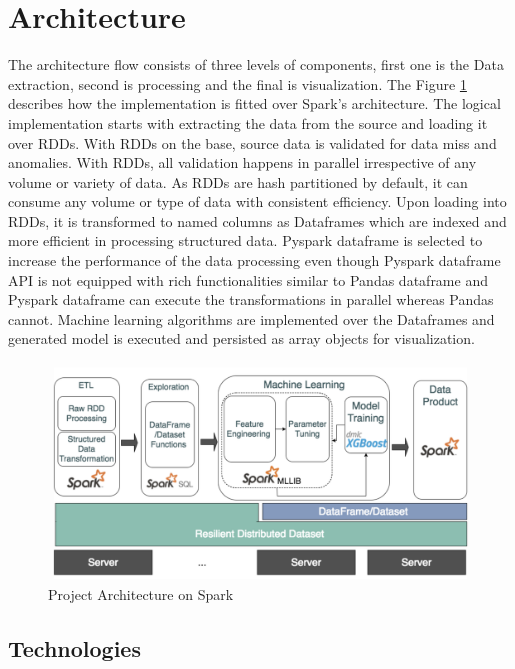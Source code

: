 \documentclass[sigconf]{acmart}
\begin{document}
\section{Architecture}
The architecture flow consists of three levels of components, first one is the Data extraction, second is processing and the final is visualization. The Figure \ref{Architecture:project} describes how the implementation is fitted over Spark's architecture.
The logical implementation starts with extracting the data from the source and loading it over RDDs. With RDDs on the base, source data is validated for data miss and anomalies. With RDDs, all validation happens in parallel irrespective of any volume or variety of data. As RDDs are hash partitioned by default, it can consume any volume or type of data with consistent efficiency. Upon loading into RDDs, it is transformed to named columns as Dataframes which are indexed and more efficient in processing structured data. Pyspark dataframe is selected to increase the performance of the data processing even though Pyspark dataframe API is not equipped with rich functionalities similar to Pandas dataframe and Pyspark dataframe can execute the transformations in parallel whereas Pandas cannot. Machine learning algorithms are implemented over the Dataframes and generated model is executed and persisted as array objects for visualization.

\begin{figure}[!ht]
  \centering\includegraphics[width=\columnwidth]{images/Projectflow.png}
  \caption{Project Architecture on Spark}
  \label{Architecture:project}
\end{figure}


\subsection{Technologies}
\end{document}
